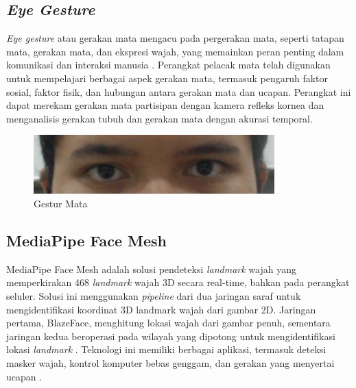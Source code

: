 \subsection{\emph{Eye Gesture}}

\textit{Eye gesture} atau gerakan mata mengacu pada pergerakan mata, seperti tatapan mata, gerakan mata, dan ekspresi wajah, yang memainkan peran penting dalam komunikasi dan interaksi manusia \cite{vanni_2022}. Perangkat pelacak mata telah digunakan untuk mempelajari berbagai aspek gerakan mata, termasuk pengaruh faktor sosial, faktor fisik, dan hubungan antara gerakan mata dan ucapan. Perangkat ini dapat merekam gerakan mata partisipan dengan kamera refleks kornea dan menganalisis gerakan tubuh dan gerakan mata dengan akurasi temporal\cite{gullberg_kita_2009}.

\begin{figure} [ht] \centering
    \includegraphics[scale=0.5]{gambar/bab3/gaze.png}
    \caption{Gestur Mata}
    \label{fig:gaze}
\end{figure}

\subsection{MediaPipe Face Mesh}

MediaPipe Face Mesh adalah solusi pendeteksi \textit{landmark} wajah yang memperkirakan 468 \textit{landmark} wajah 3D secara real-time, bahkan pada perangkat seluler. Solusi ini menggunakan \textit{pipeline} dari dua jaringan saraf untuk mengidentifikasi koordinat 3D landmark wajah dari gambar 2D. Jaringan pertama, BlazeFace, menghitung lokasi wajah dari gambar penuh, sementara jaringan kedua beroperasi pada wilayah yang dipotong untuk mengidentifikasi lokasi \textit{landmark} \cite{mediapipe_2020}. Teknologi ini memiliki berbagai aplikasi, termasuk deteksi masker wajah, kontrol komputer bebas genggam, dan gerakan yang menyertai ucapan \cite{thaman_2022}.

